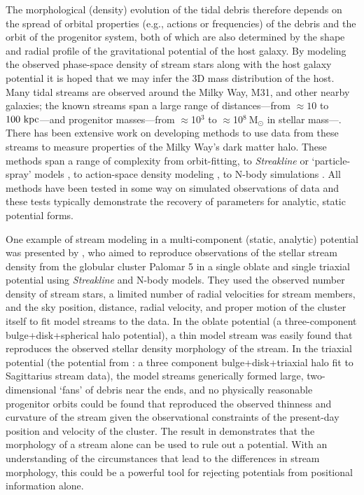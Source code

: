 \documentclass[letterpaper,12pt,preprint]{aastex}
\newcommand{\msun}{\ensuremath{\mathrm{M}_\odot}}
\begin{document}
The morphological (density) evolution of the tidal debris therefore depends on the spread of orbital properties (e.g., actions or frequencies) of the debris and the orbit of the progenitor system, both of which are also determined by the shape and radial profile of the gravitational potential of the host galaxy. By modeling the observed phase-space density of stream stars along with the host galaxy potential it is hoped that we may infer the 3D mass distribution of the host. Many tidal streams are observed around the Milky Way, M31, and other nearby galaxies; the known streams span a large range of distances---from $\approx10$ to $100~{\rm kpc}$---and progenitor masses---from $\approx$10$^3$ to $\approx$10$^8~\msun$ in stellar mass---\citep[][]{ibata94,odenkirchen01,belokurov06,grillmair06a,grillmair06b,bonaca12}. There has been extensive work on developing methods to use data from these streams to measure properties of the Milky Way's dark matter halo. These methods span a range of complexity from orbit-fitting, to \emph{Streakline} \citep{kuepper12} or `particle-spray' models \citep{gibbons14}, to action-space density modeling \citep[e.g.,][]{sanders14, bovy14}, to N-body simulations \citep[e.g.,][]{law10}. All methods have been tested in some way on simulated observations of data and these tests typically demonstrate the recovery of parameters for analytic, static potential forms.

One example of stream modeling in a multi-component (static, analytic) potential was presented by \citet{pearson15}, who aimed to reproduce observations of the stellar stream density from the globular cluster Palomar 5 in a single oblate and single triaxial potential using \emph{Streakline} \citep{kuepper12} and N-body models. They used the observed number density of stream stars, a limited number of radial velocities for stream members, and the sky position, distance, radial velocity, and proper motion of the cluster itself to fit model streams to the data. In the oblate potential (a three-component bulge+disk+spherical halo potential), a thin model stream was easily found that reproduces the observed stellar density morphology of the stream. In the triaxial potential (the potential from \cite{law10}: a three component bulge+disk+triaxial halo fit to Sagittarius stream data), the model streams generically formed large, two-dimensional `fans' of debris near the ends, and no physically reasonable progenitor orbits could be found that reproduced the observed thinness and curvature of the stream given the observational constraints of the present-day position and velocity of the cluster. The result in \citet{pearson15} demonstrates that the morphology of a stream alone can be used to rule out a potential. With an understanding of the circumstances that lead to the differences in stream morphology, this could be a powerful tool for rejecting potentials from positional information alone.
\end{document}
